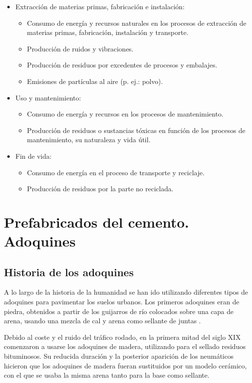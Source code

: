 \begin{itemize}
  \item Extracción de materias primas, fabricación e instalación:
    \begin{itemize}
     \item Consumo de energía y recursos naturales en los procesos de extracción de materias primas, fabricación, instalación y transporte.
     \item Producción de ruidos y vibraciones.
     \item Producción de residuos por excedentes de procesos y embalajes.
     \item Emisiones de partículas al aire (p. ej.: polvo).
    \end{itemize}
  \item Uso y mantenimiento:
    \begin{itemize}
      \item Consumo de energía y recursos en los procesos de mantenimiento.
      \item Producción de residuos o sustancias tóxicas en función de los procesos de mantenimiento, su naturaleza y vida útil.
    \end{itemize}
  \item Fin de vida:
    \begin{itemize}
      \item Consumo de energía en el proceso de transporte y reciclaje.
      \item Producción de residuos por la parte no reciclada.
    \end{itemize}
\end{itemize}

\section{Prefabricados del cemento. Adoquines}

\subsection{Historia de los adoquines}
A lo largo de la historia de la humanidad se han ido utilizando diferentes tipos de adoquines para pavimentar los suelos urbanos. Los primeros adoquines eran de piedra, obtenidos a partir de los guijarros de río colocados sobre una capa de arena, usando una mezcla de cal y arena como sellante de juntas  \cite{euroadoquin}.

Debido al coste y el ruido del tráfico rodado, en la primera mitad del siglo XIX comenzaron a usarse los adoquines de madera, utilizando para el sellado residuos bituminosos. Su reducida duración y la posterior aparición de los neumáticos hicieron que los adoquines de madera fueran sustituidos por un modelo cerámico, con el que se usaba la misma arena tanto para la base como sellante.

